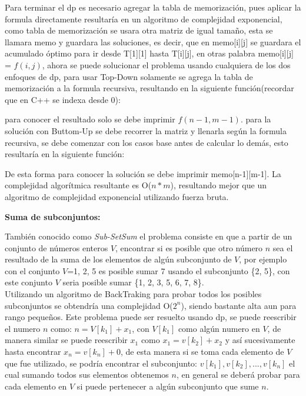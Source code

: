 \documentclass[12pt, a4paper]{article}
\newcommand\cppfile[2][]{

}
\newcommand{\subtitulo}[1]{\begin{center}\textbf{#1}\end{center}}
\begin{document}
	Para terminar el dp es necesario agregar la tabla de memorización, pues aplicar la formula directamente resultaría
	en un algoritmo de complejidad exponencial, como tabla de memorización se usara otra matriz de igual tamaño,
	esta se llamara memo y guardara las soluciones, es decir, que en memo[i][j] se guardara el acumulado óptimo para 
	ir desde T[1][1] hasta T[i][j], en otras palabra memo[i][j] = $f(i,j)$, ahora se puede solucionar el problema 
	usando cualquiera de los dos enfoques de dp, para usar Top-Down solamente se agrega la tabla de memorización 
	a la formula recursiva, resultando en la siguiente función(recordar que en C++ se indexa desde 0):
	\cppfile[9-20]{codigos/matriz.cpp}
	
	para conocer el resultado solo se debe imprimir $f(n-1, m-1)$. para la solución con Buttom-Up se debe recorrer 
	la matriz y llenarla según la formula recursiva, se debe comenzar con los casos base antes de calcular lo demás, 
	esto resultaría en la siguiente función:
	\cppfile[22-35]{codigos/matriz.cpp}
	De esta forma para conocer la solución se debe imprimir memo[n-1][m-1]. La complejidad algorítmica resultante
	es O($n*m$), resultando mejor que un algoritmo de complejidad exponencial utilizando fuerza bruta.\\
	
	\subtitulo{Suma de subconjuntos:}
	
	También conocido como \textit{Sub-SetSum} el problema consiste en que a partir de un conjunto de números enteros
	$V$, encontrar si es posible que otro número $n$ sea el resultado de la suma de los elementos de algún
	subconjunto de $V$, por ejemplo con el conjunto $V$={1, 2, 5} es posible sumar 7 usando el subconjunto \{2, 5\},
	con este conjunto $V$ seria posible sumar \{1, 2, 3, 5, 6, 7, 8\}.\\
	
	Utilizando un algoritmo de BackTraking para probar todos los posibles subconjuntos se obtendría una complejidad
	O($2^{n}$), siendo bastante alta aun para rango pequeños. Este problema puede ser resuelto usando dp, se puede
	reescribir el numero $n$ como: $n=V[k_{1}]+x_{1}$, con $V[k_{1}]$ como algún numero en $V$, de manera similar se
	puede reescribir $x_{1}$ como $x_{1}=v[k_{2}]+x_{2}$ y así sucesivamente hasta encontrar $x_{n}=v[k_{n}]+0$, de 
	esta manera si se toma cada elemento de $V$ que fue utilizado, se podría encontrar el subconjunto:
	${v[k_{1}],v[k_{2}],...,v[k_{n}]}$ el cual sumando todos sus elementos obtenemos $n$, en general se deberá probar
	para cada elemento en $V$ si puede pertenecer a algún subconjunto que sume $n$.
	
\end{document}
